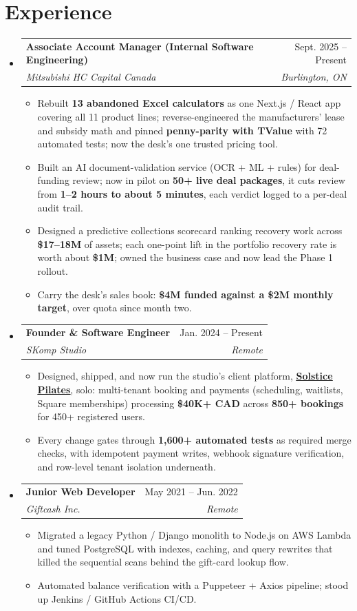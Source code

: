 \documentclass[letterpaper,11pt]{article}
\makeatletter
\newcommand{\resumeItem}[1]{
  \item\small{
    {#1 \vspace{-2pt}}
  }
}
\newcommand{\resumeSubheading}[4]{
  \vspace{-2pt}\item
    \begin{tabular*}{0.97\textwidth}[t]{l@{\extracolsep{\fill}}r}
      \textbf{#1} & #2 \\
      \textit{\small#3} & \textit{\small #4} \\
    \end{tabular*}\vspace{-7pt}
}
\newcommand{\resumeSubHeadingListStart}{\begin{itemize}[leftmargin=0.15in, label={}]}
\newcommand{\resumeSubHeadingListEnd}{\end{itemize}}
\newcommand{\resumeItemListStart}{\begin{itemize}}
\newcommand{\resumeItemListEnd}{\end{itemize}\vspace{-5pt}}
\makeatother
\begin{document}
\section{Experience}
  \resumeSubHeadingListStart
    \resumeSubheading
      {Associate Account Manager (Internal Software Engineering)}{Sept. 2025 -- Present}
      {Mitsubishi HC Capital Canada}{Burlington, ON}
      \resumeItemListStart
        \resumeItem{Rebuilt \textbf{13 abandoned Excel calculators} as one Next.js / React app covering all 11 product lines; reverse-engineered the manufacturers' lease and subsidy math and pinned \textbf{penny-parity with TValue} with 72 automated tests; now the desk's one trusted pricing tool.}
        \resumeItem{Built an AI document-validation service (OCR + ML + rules) for deal-funding review; now in pilot on \textbf{50+ live deal packages}, it cuts review from \textbf{1--2 hours to about 5 minutes}, each verdict logged to a per-deal audit trail.}
        \resumeItem{Designed a predictive collections scorecard ranking recovery work across \textbf{\$17--18M} of assets; each one-point lift in the portfolio recovery rate is worth about \textbf{\$1M}; owned the business case and now lead the Phase 1 rollout.}
        \resumeItem{Carry the desk's sales book: \textbf{\$4M funded against a \$2M monthly target}, over quota since month two.}
      \resumeItemListEnd
    \resumeSubheading
      {Founder \& Software Engineer}{Jan. 2024 -- Present}
      {SKomp Studio}{Remote}
      \resumeItemListStart
        \resumeItem{Designed, shipped, and now run the studio's client platform, \href{https://www.solsticepilates.ca/}{\underline{\textbf{Solstice Pilates}}}, solo: multi-tenant booking and payments (scheduling, waitlists, Square memberships) processing \textbf{\$40K+ CAD} across \textbf{850+ bookings} for 450+ registered users.}
        \resumeItem{Every change gates through \textbf{1,600+ automated tests} as required merge checks, with idempotent payment writes, webhook signature verification, and row-level tenant isolation underneath.}
      \resumeItemListEnd
    \resumeSubheading
      {Junior Web Developer}{May 2021 -- Jun. 2022}
      {Giftcash Inc.}{Remote}
      \resumeItemListStart
        \resumeItem{Migrated a legacy Python / Django monolith to Node.js on AWS Lambda and tuned PostgreSQL with indexes, caching, and query rewrites that killed the sequential scans behind the gift-card lookup flow.}
        \resumeItem{Automated balance verification with a Puppeteer + Axios pipeline; stood up Jenkins / GitHub Actions CI/CD.}
      \resumeItemListEnd
  \resumeSubHeadingListEnd
\end{document}
